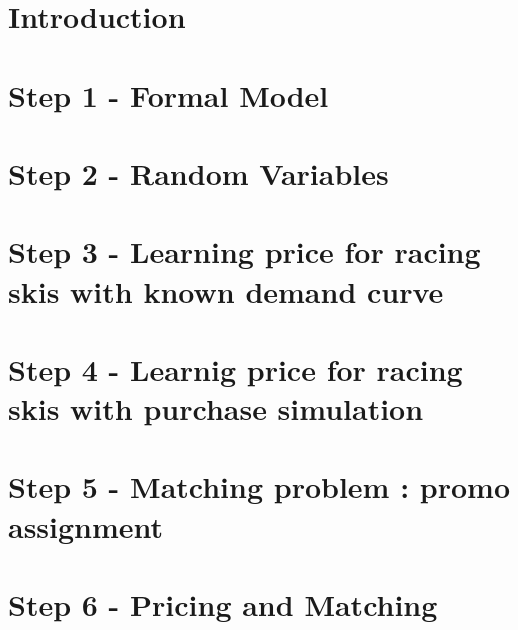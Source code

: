 


	
	\tableofcontents
    \clearpage
	\section*{Introduction}
    \label{sect:Introduction}
		
    \section*{Step 1 - Formal Model}
    \label{sect:Step 1 - Formal Model}
		
    \section*{Step 2 - Random Variables}
    \label{sect:Step 2 - Random Variables}
			
    \section*{Step 3 - Learning price for racing skis with known demand curve}
    \label{sect:Step 3 - Learning price for racing skis with known demand curve}
		
    \section*{Step 4 - Learnig price for racing skis with purchase simulation}
    \label{sect:Step 4 - Learnig price for racing skis with purchase simulation}
		
    \section*{Step 5 - Matching problem : promo assignment}
    \label{sect:Step 5 - Matching problem : promo assignment}
		
    \section*{Step 6 - Pricing and Matching}
    \label{sect:Step 6 - Pricing and Matching}
		
